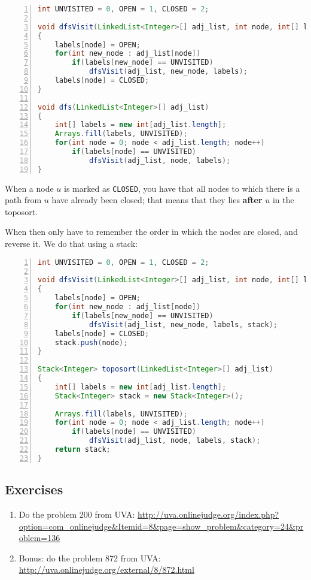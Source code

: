 \begin{lstlisting}[label=code-dfs,caption=DFS algorithm, language=Java, tabsize=2, breaklines=true, numbers=left]
int UNVISITED = 0, OPEN = 1, CLOSED = 2;

void dfsVisit(LinkedList<Integer>[] adj_list, int node, int[] labels)
{
	labels[node] = OPEN;
	for(int new_node : adj_list[node])
		if(labels[new_node] == UNVISITED)
			dfsVisit(adj_list, new_node, labels);
	labels[node] = CLOSED;
}

void dfs(LinkedList<Integer>[] adj_list)
{
	int[] labels = new int[adj_list.length];
	Arrays.fill(labels, UNVISITED);
	for(int node = 0; node < adj_list.length; node++)
		if(labels[node] == UNVISITED)
			dfsVisit(adj_list, node, labels);
}
\end{lstlisting}

When a node $u$ is marked as \texttt{CLOSED}, you have that all nodes to which there is a path from $u$ have already been closed; that means that they lies \textbf{after} $u$ in the toposort.

When then only have to remember the order in which the nodes are closed, and reverse it. We do that using a stack:

\begin{lstlisting}[label=code-toposort,caption=Toposort algorithm, language=Java, tabsize=2, breaklines=true, numbers=left]
int UNVISITED = 0, OPEN = 1, CLOSED = 2;

void dfsVisit(LinkedList<Integer>[] adj_list, int node, int[] labels, Stack<Integer> stack)
{
	labels[node] = OPEN;
	for(int new_node : adj_list[node])
		if(labels[new_node] == UNVISITED)
			dfsVisit(adj_list, new_node, labels, stack);
	labels[node] = CLOSED;
    stack.push(node);
}

Stack<Integer> toposort(LinkedList<Integer>[] adj_list)
{
	int[] labels = new int[adj_list.length];
    Stack<Integer> stack = new Stack<Integer>();
    
	Arrays.fill(labels, UNVISITED);
	for(int node = 0; node < adj_list.length; node++)
		if(labels[node] == UNVISITED)
			dfsVisit(adj_list, node, labels, stack);
    return stack;
}
\end{lstlisting}

\subsection{Exercises}
\begin{enumerate}
\item Do the problem 200 from UVA: \url{http://uva.onlinejudge.org/index.php?option=com_onlinejudge&Itemid=8&page=show_problem&category=24&problem=136}
\item Bonus: do the problem 872 from UVA: \url{http://uva.onlinejudge.org/external/8/872.html}
\end{enumerate}